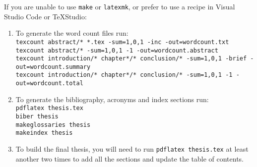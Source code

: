 If you are unable to use \texttt{make} or \texttt{latexmk}, or prefer to use a recipe in
Visual Studio Code or TeXStudio:
\begin{enumerate}
  \item To generate the word count files run:\vspace{1ex}\\
    \texttt{\small texcount abstract/* *.tex -sum=1,0,1 -inc -out=wordcount.txt\\
    texcount abstract/* -sum=1,0,1 -1 -out=wordcount.abstract\\
    texcount introduction/* chapter*/* conclusion/* -sum=1,0,1 -brief -out=wordcount.summary\\
    texcount introduction/* chapter*/* conclusion/* -sum=1,0,1 -1 -out=wordcount.total}
  \item To generate the bibliography, acronyms and index sections run:\vspace{1ex}\\
    \texttt{\small pdflatex thesis.tex\\
    biber thesis\\
    makeglossaries thesis\\
    makeindex thesis}
  \item To build the final thesis, you will need to run \texttt{pdflatex thesis.tex} at least
    another two times to add all the sections and update the table of contents.
\end{enumerate}
